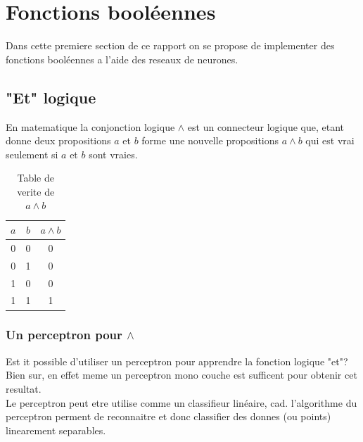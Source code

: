 \documentclass[twoside,openright,a4paper,11pt,french]{article}
\begin{document}
\pagestyle{plain}
\setlength{\parindent}{0pt}



\parskip=0pt
\tableofcontents
\clearpage


\vspace{5cm}


\section{Fonctions booléennes}

Dans cette premiere section de ce rapport on se propose
de implementer des fonctions booléennes a l'aide des reseaux
de neurones. 

\subsection{"Et" logique}

En matematique la conjonction logique $\land$ est un
connecteur logique que, etant donne deux propositions $a$ et $b$
forme une nouvelle propositions $a \land b$ qui est vrai seulement
si $a$ et $b$ sont vraies.

\begin{table}[h]
  \centering
  \begin{tabular}{| c | c | c |}
    \hline
    \textbf{$a$} & \textbf{$b$} & \textbf{$a \land b$}\\
    \hline
    0 & 0  & 0 \\
    \hline
    0 & 1  & 0 \\
    \hline
    1 & 0  & 0 \\
    \hline
    1 & 1  & 1 \\
    \hline
  \end{tabular}
  \caption{Table de verite de $a \land b$}
  \label{tab:et}
\end{table}




\subsubsection{Un perceptron pour $\land$} 

Est it possible d'utiliser un perceptron pour apprendre la fonction logique
"et"? Bien sur, en effet meme un perceptron mono couche est sufficent pour
obtenir cet resultat.\\

Le perceptron peut etre utilise comme un classifieur linéaire, cad. l'algorithme du
perceptron perment de reconnaitre et donc classifier des donnes (ou points)
linearement separables.\\
\end{document}
